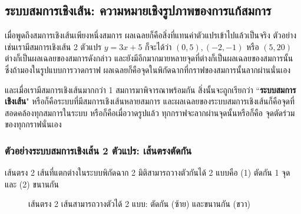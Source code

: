 \subsection{ระบบสมการเชิงเส้น: ความหมายเชิงรูปภาพของการแก้สมการ}
เมื่อพูดถึงสมการเชิงเส้นเพียงหนึ่งสมการ ผลเฉลยก็คือสิ่งที่แทนค่าตัวแปรเข้าไปแล้วเป็นจริง ตัวอย่างเช่นเรามีสมการเชิงเส้น 2 ตัวแปร $y = 3x + 5$ ก็จะได้ว่า $(0,5), (-2,-1)$ หรือ $(5,20)$ ต่างก็เป็นผลเฉลยของสมการดังกล่าว และยังมีอีกมากมายหลายจุดที่ต่างก็เป็นผลเฉลยของสมการนั้น
ซึ่งถ้ามองในรูปแบบการวาดกราฟ ผลเฉลยก็คือจุดในพิกัดฉากที่กราฟของสมการนั้นลากผ่านนั่นเอง

และเมื่อเรามีสมการเชิงเส้นมากกว่า 1 สมการมาพิจารณาพร้อมกัน สิ่งนั้นจะถูกเรียกว่า ``\textbf{ระบบสมการเชิงเส้น}" หรือก็คือระบบที่มีสมการเชิงเส้นหลายสมการ และผลเฉลยของระบบสมการเชิงเส้นก็คือจุดที่สอดคล้องทุกสมการในระบบ หรือก็คือเมื่อวาดรูปแล้ว ทุกกราฟจะลากผ่านจุดนั้นหรือก็คือ จุดตัดร่วมของทุกกราฟนั่นเอง

\subsubsection{ตัวอย่างระบบสมการเชิงเส้น 2 ตัวแปร: เส้นตรงตัดกัน}
เส้นตรง 2 เส้นที่แตกต่างในระบบพิกัดฉาก 2 มิติสามารถวางตัวกันได้ 2 แบบคือ (1) ตัดกัน 1 จุด และ (2) ขนานกัน
\begin{figure}[ht]
\centering

\begin{minipage}[t]{0.45\textwidth}
\centering
{}
\end{minipage}
\hfill
\begin{minipage}[t]{0.45\textwidth}
\centering
{}
\end{minipage}

\caption{เส้นตรง 2 เส้นสามารถวางตัวได้ 2 แบบ: ตัดกัน (ซ้าย) และขนานกัน (ขวา)}
\label{fig:line-relations}
\end{figure}


